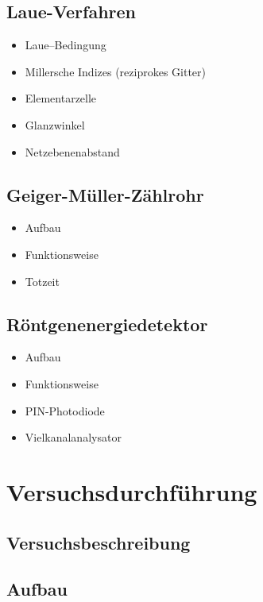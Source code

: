 \documentclass[10pt, a4paper]{article}
\begin{document}
\subsection{Laue-Verfahren}

\begin{itemize}
  \item Laue--Bedingung
  \item Millersche Indizes (reziprokes Gitter)
  \item Elementarzelle
  \item Glanzwinkel
  \item Netzebenenabstand
\end{itemize}  

\subsection{Geiger-Müller-Zählrohr}

\begin{itemize}
  \item Aufbau
  \item Funktionsweise
  \item Totzeit
\end{itemize}
  
\subsection{Röntgenenergiedetektor}

\begin{itemize}
  \item Aufbau
  \item Funktionsweise
  \item PIN-Photodiode
  \item Vielkanalanalysator
\end{itemize}



\section{Versuchsdurchführung}

\subsection{Versuchsbeschreibung}

\subsection{Aufbau}
\end{document}
